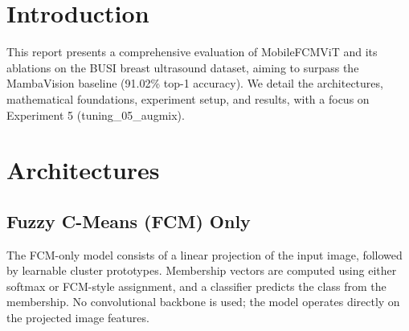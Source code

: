 

\section{Introduction}
This report presents a comprehensive evaluation of MobileFCMViT and its ablations on the BUSI breast ultrasound dataset, aiming to surpass the MambaVision baseline (91.02\% top-1 accuracy). We detail the architectures, mathematical foundations, experiment setup, and results, with a focus on Experiment 5 (tuning\_05\_augmix).

\section{Architectures}
\subsection{Fuzzy C-Means (FCM) Only}
The FCM-only model consists of a linear projection of the input image, followed by learnable cluster prototypes. Membership vectors are computed using either softmax or FCM-style assignment, and a classifier predicts the class from the membership. No convolutional backbone is used; the model operates directly on the projected image features.

